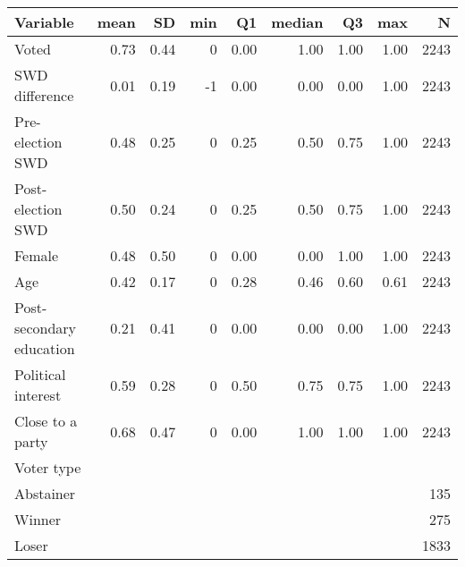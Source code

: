 
\begin{tabular}{l|r|r|r|r|r|r|r|r}
\hline
Variable & mean & SD & min & Q1 & median & Q3 & max & N\\
\hline
Voted & 0.73 & 0.44 & 0 & 0.00 & 1.00 & 1.00 & 1.00 & 2243\\
\hline
SWD difference & 0.01 & 0.19 & -1 & 0.00 & 0.00 & 0.00 & 1.00 & 2243\\
\hline
Pre-election SWD & 0.48 & 0.25 & 0 & 0.25 & 0.50 & 0.75 & 1.00 & 2243\\
\hline
Post-election SWD & 0.50 & 0.24 & 0 & 0.25 & 0.50 & 0.75 & 1.00 & 2243\\
\hline
Female & 0.48 & 0.50 & 0 & 0.00 & 0.00 & 1.00 & 1.00 & 2243\\
\hline
Age & 0.42 & 0.17 & 0 & 0.28 & 0.46 & 0.60 & 0.61 & 2243\\
\hline
Post-secondary education & 0.21 & 0.41 & 0 & 0.00 & 0.00 & 0.00 & 1.00 & 2243\\
\hline
Political interest & 0.59 & 0.28 & 0 & 0.50 & 0.75 & 0.75 & 1.00 & 2243\\
\hline
Close to a party & 0.68 & 0.47 & 0 & 0.00 & 1.00 & 1.00 & 1.00 & 2243\\
\hline
Voter type &  &  &  &  &  &  &  & \\
\hline
Abstainer &  &  &  &  &  &  &  & 135\\
\hline
Winner &  &  &  &  &  &  &  & 275\\
\hline
Loser &  &  &  &  &  &  &  & 1833\\
\hline
\end{tabular}
